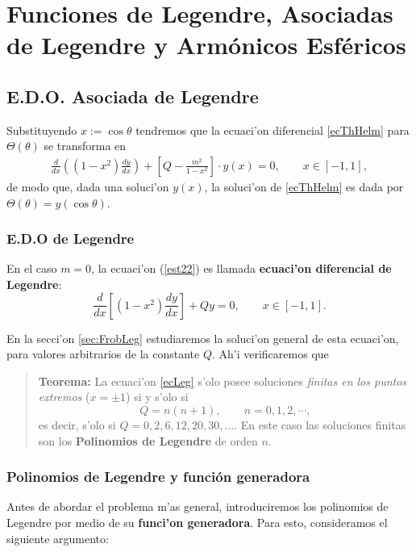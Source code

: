 \chapter{Funciones de Legendre, Asociadas de Legendre y Arm\'onicos Esf\'ericos}

\section{E.D.O. Asociada de Legendre}
Substituyendo $x:=\cos\theta$ tendremos que la ecuaci'on diferencial \eqref{ecThHelm} para $\Theta(\theta)$ se transforma en 
\begin{eqnarray}
\frac{d}{dx}\left((1-x^2)\frac{dy}{dx}\right) +
\left[Q-\frac{m^2}{1-x^2}\right]\cdot y(x) = 0, \qquad x\in [-1,1],\label{est22}
\end{eqnarray}
de modo que, dada una soluci'on $y(x)$, la soluci'on de \eqref{ecThHelm} es dada por $\Theta(\theta)=y(\cos\theta)$. 

\subsection{E.D.O de Legendre}
En el caso $m=0$, la ecuaci'on (\ref{est22}) es llamada \textbf{ecuaci'on
diferencial de Legendre}:
\begin{equation}\label{ecLeg}
\frac{d}{dx}\left[\left(1-x^2 \right)\frac{dy}{dx}\right]+Qy=0, \qquad x\in [-1,1].
\end{equation}

 En la secci'on \ref{sec:FrobLeg} estudiaremos la soluci'on general de esta ecuaci'on, para valores arbitrarios de la constante $Q$. Ah'i verificaremos que 
\begin{quotation}
\textbf{Teorema:} La ecuaci'on \eqref{ecLeg} s'olo posee soluciones \textit{finitas en los puntos extremos} ($x=\pm 1$) si y s'olo si
\begin{equation}
Q=n(n+1),\qquad n=0, 1,2, \cdots,
\end{equation} 
es decir, s'olo si $Q=0,2,6,12,20,30,\dots$. En este caso las soluciones finitas son los \textbf{Polinomios de Legendre} de orden $n$. 
\end{quotation}

\subsection{Polinomios de Legendre y funci\'on generadora}
Antes de abordar el problema m'as general, introduciremos los polinomios de Legendre por medio de su \textbf{funci'on generadora}. Para esto, consideramos el siguiente argumento:

